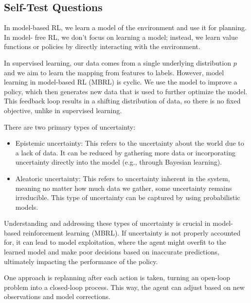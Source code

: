 \subsection{Self-Test Questions}
\begin{enumerate}
\newline
In model-based RL, we learn a model of the environment and use it for planning. In model-
free RL, we don't focus on learning a model; instead, we learn value functions or policies 
by directly interacting with the environment.

\newline
In supervised learning, our data comes from a single underlying distribution $p$ and we 
aim to learn the mapping from features to labels. However, model learning in model-based 
RL (MBRL) is cyclic. We use the model to improve a policy, which then generates new data 
that is used to further optimize the model. This feedback loop results in a shifting 
distribution of data, so there is no fixed objective, unlike in supervised learning.

 \newline
There are two primary types of uncertainty:
\begin{itemize}
    \item Epistemic uncertainty: This refers to the uncertainty about the world due to a 
    lack of data. It can be reduced by gathering more data or incorporating uncertainty 
    directly into the model (e.g., through Bayesian learning).
    \item Aleatoric uncertainty: This refers to uncertainty inherent in the system, meaning no matter how much data we gather, some uncertainty remains irreducible. This type of uncertainty can be captured by using probabilistic models.
\end{itemize}
Understanding and addressing these types of uncertainty is crucial in model-based 
reinforcement learning (MBRL). If uncertainty is not properly accounted for, it can lead 
to model exploitation, where the agent might overfit to the learned model and make poor 
decisions based on inaccurate predictions, ultimately impacting the performance of the 
policy.

\newline
One approach is replanning after each action is taken, turning an open-loop problem into a 
closed-loop process. This way, the agent can adjust based on new observations and model 
corrections.


\end{enumerate}
